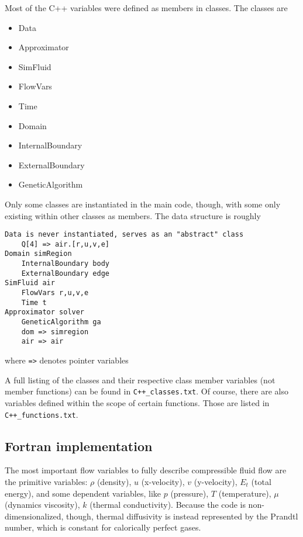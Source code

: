 \documentclass[12pt]{article}
\begin{document}
        Most of the C++ variables were defined as members in classes. The classes are
        \begin{multicols}{3}
            \begin{itemize}
                \item Data
                \item Approximator
                \item SimFluid
                \item FlowVars
                \item Time
                \item Domain
                \item InternalBoundary
                \item ExternalBoundary
                \item GeneticAlgorithm
            \end{itemize}
        \end{multicols}
        Only some classes are instantiated in the main code, though, with some only existing within other classes as members. The data structure is roughly
        \begin{verbatim}
Data is never instantiated, serves as an "abstract" class
    Q[4] => air.[r,u,v,e]
Domain simRegion
    InternalBoundary body
    ExternalBoundary edge
SimFluid air
    FlowVars r,u,v,e
    Time t
Approximator solver
    GeneticAlgorithm ga
    dom => simregion
    air => air
        \end{verbatim}
        where \texttt{=>} denotes pointer variables

        A full listing of the classes and their respective class member variables (not member functions) can be found in \texttt{C++\_classes.txt}. Of course, there are also variables defined within the scope of certain functions. Those are listed in \texttt{C++\_functions.txt}.
    \subsection*{Fortran implementation}
    The most important flow variables to fully describe compressible fluid flow are the primitive variables: $\rho$ (density), $u$ (x-velocity), $v$ (y-velocity), $E_t$ (total energy), and some dependent variables, like $p$ (pressure), $T$ (temperature), $\mu$ (dynamics viscosity), $k$ (thermal conductivity). Because the code is non-dimensionalized, though, thermal diffusivity is instead represented by the Prandtl number, which is constant for calorically perfect gases.
\end{document}
